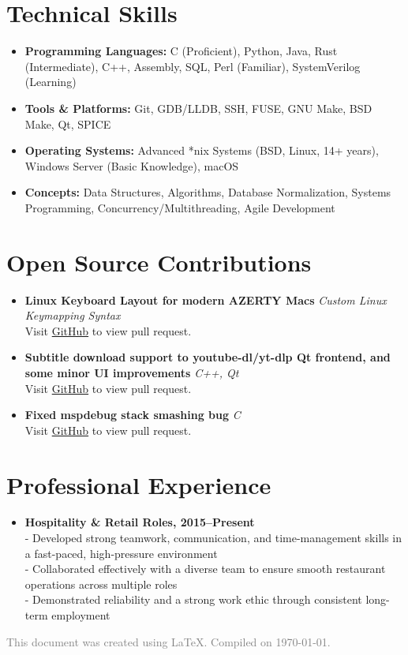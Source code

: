 \documentclass[11pt]{article}
\begin{document}
\section*{Technical Skills}
\vspace{-0.1in}
\begin{itemize}[leftmargin=*]
    \item \textbf{Programming Languages:} C (Proficient), Python, Java, Rust (Intermediate), C++, Assembly, SQL, Perl (Familiar), SystemVerilog (Learning)
    \item \textbf{Tools \& Platforms:} Git, GDB/LLDB, SSH, FUSE, GNU Make, BSD Make, Qt, SPICE
    \item \textbf{Operating Systems:} Advanced *nix Systems (BSD, Linux, 14+ years), Windows Server (Basic Knowledge), macOS
    \item \textbf{Concepts:} Data Structures, Algorithms, Database Normalization, Systems Programming, Concurrency/Multithreading, Agile Development
\end{itemize}

\section*{Open Source Contributions}
\vspace{-0.1in}
\begin{itemize}[leftmargin=*]
	\item \textbf{Linux Keyboard Layout for modern AZERTY Macs} \hfill \textit{Custom Linux Keymapping Syntax} \\
	Visit \href{https://github.com/legionus/kbd/pull/98}{GitHub} to view pull request.
	\item \textbf{Subtitle download support to youtube-dl/yt-dlp Qt frontend, and some minor UI improvements} \hfill \textit{C++, Qt} \\
	Visit \href{https://github.com/rrooij/youtube-dl-qt/pull/5}{GitHub} to view pull request.
	\item \textbf{Fixed mspdebug stack smashing bug} \hfill \textit{C} \\
	Visit \href{https://github.com/dlbeer/mspdebug/pull/138}{GitHub} to view pull request.
\end{itemize}

\section*{Professional Experience}
\vspace{-0.1in}
\begin{itemize}[leftmargin=*]
    \item \textbf{Hospitality \& Retail Roles, 2015–Present} \\
    - Developed strong teamwork, communication, and time-management skills in a fast-paced, high-pressure environment \\
    - Collaborated effectively with a diverse team to ensure smooth restaurant operations across multiple roles \\
    - Demonstrated reliability and a strong work ethic through consistent long-term employment
\end{itemize}

\vspace{0.2in}
\begin{center}
\footnotesize
\textcolor{gray}{This document was created using \LaTeX. Compiled on \today.}
\end{center}
\end{document}
